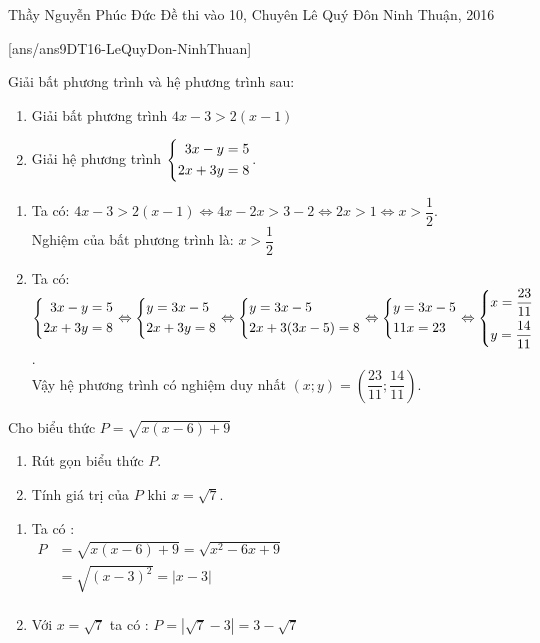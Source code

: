 \begin{name}
{Thầy  Nguyễn Phúc Đức}
{Đề thi vào 10, Chuyên Lê Quý Đôn Ninh Thuận, 2016}
\end{name}
\setcounter{ex}{0}
[ans/ans9DT16-LeQuyDon-NinhThuan]
\begin{ex}%
     Giải bất phương trình và hệ phương trình sau:
    \hfill
     \begin{enumerate}
        \item Giải bất phương trình $4x-3>2(x-1)$
        \item Giải hệ phương trình $\left\{\begin{aligned}3x-y&=5\\ 2x+3y&=8\end{aligned}\right.$.
    \end{enumerate}
\loigiai
    {
    \begin{enumerate}
        \item Ta có: $4x-3>2(x-1)\Leftrightarrow 4x-2x>3-2\Leftrightarrow 2x>1\Leftrightarrow x>\dfrac{1}{2}$.\\
        Nghiệm của bất phương trình là: $x>\dfrac{1}{2}$
        \item Ta có: $\left\{\begin{aligned}3x-y&=5\\ 2x+3y&=8\end{aligned}\right.\Leftrightarrow \left\{\begin{aligned}&y=3x-5\\ &2x+3y=8\end{aligned}\right.\Leftrightarrow \left\{\begin{aligned}&y=3x-5\\ &2x+3(3x-5)=8\end{aligned}\right.\Leftrightarrow \left\{\begin{aligned}&y=3x-5\\ &11x=23\end{aligned}\right.\Leftrightarrow \left\{\begin{aligned}&x=\dfrac{23}{11}\\ &y=\dfrac{14}{11}\end{aligned}\right.$.\\
        Vậy hệ phương trình có nghiệm duy nhất $(x; y)=\left(\dfrac{23}{11}; \dfrac{14}{11}\right)$.
    \end{enumerate}
    }
\end{ex}

\begin{ex}%
Cho biểu thức $P=\sqrt{x(x-6)+9}$
    \begin{enumerate}    
        \item Rút gọn biểu thức $P$.
        \item Tính giá trị của $P$ khi $x=\sqrt{7}$.
    \end{enumerate}
\loigiai
    {
    \begin{enumerate}
        \item Ta có :\\
        $\begin{aligned}
        P&=\sqrt{x(x-6)+9}=\sqrt{x^2-6x+9}\\
        &=\sqrt{(x-3)^2}=\left|x-3\right|\\
      \end{aligned}$
        \item Với $x=\sqrt{7}$ ta có : $P=\left|\sqrt{7}-3\right|=3-\sqrt{7}$ 
       \end{enumerate}
    }
\end{ex}

